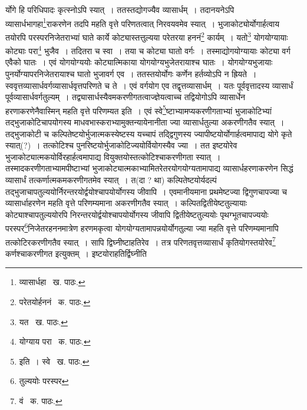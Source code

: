 \documentclass[11pt, openany]{book}
\begin{document}
\noindent र्योगे हि परिधिपादः कृत्स्नोऽपि स्यात्~। ततस्तद्योगज्यैव व्यासार्धम्~। तदानयनेऽपि व्यासार्धभागहा\renewcommand{\thefootnote}{१}\footnote{व्यासार्धहा \textendash\ ख. पाठः.}राकरणेन तदपि महति वृत्ते परिणतत्वात् निरवयवमेव स्यात्~। भुजाकोट्योर्योगार्हत्वाय तयोरपि परस्परनिजेतराभ्यां घाते कार्ये कोट्यास्तत्तुल्यया परेतरया हननं\renewcommand{\thefootnote}{२}\footnote{परेतयोर्हननं \textendash\ क. पाठः.} कार्यम्~। यतो\renewcommand{\thefootnote}{३}\footnote{यत \textendash\ ख. पाठः.} योगयोग्यायाः कोट्याः परा\renewcommand{\thefootnote}{४}\footnote{योग्याय परा \textendash\ क. पाठः.} भुजैव~। तदितरा च स्वा~। तया च कोट्या घातो वर्गः~। तस्माद्योगयोग्यायाः कोट्या वर्ग एवैको घातः~। एवं योगयोग्ययोः कोट्यात्मिकाया योगयोग्यभुजेतरायाश्च घातः~। योगयोग्यभुजायाः पुनर्योग्यापरनिजेतरायाश्च घातो भुजावर्ग एव~। ततस्तयोर्योगः कर्णेन हर्तव्योऽपि न ह्रियते~। स्ववृत्तव्यासार्धवर्गव्यासार्धवृत्तपरिणते च ते~। एवं वर्गयोग एव तद्वृत्तव्यासार्धम्~। यतः पूर्ववृत्तादस्य व्यासार्धं पूर्वव्यासार्धवर्गतुल्यम्~। तद्व्यासार्धस्यैवमकरणीगतत्वाज्ज्ञेयत्वाच्च तद्वियोगोऽपि व्यासार्धेन हरणाकरणेनैवास्मिन् महति वृत्ते परिणम्यत इति~। एवं स्वे\renewcommand{\thefootnote}{५}\footnote{इति~। स्वे \textendash\ ख. पाठः.}ष्टाभ्यामप्यकरणीगताभ्यां भुजाकोटिभ्यां तद्भुजाकोटिचापयोगस्य माधवभास्कराभ्यामुक्तन्यायेनानीता ज्या व्यासार्धतुल्या अकरणीगतैव स्यात्~। तद्भुजाकोटी च कल्पितेष्टयोर्भुजात्मकस्येष्टस्य यच्चापं तद्द्विगुणस्य ज्यापीष्टयोर्योगार्हत्वमापाद्य योगे कृते स्यात्(?)~। तत्कोटिश्च पुनरिष्टयोर्भुजाकोटिज्ययोर्वियोगस्यैव ज्या~। तत इष्टयोरेव भुजाकोट्यात्मकयोर्विरहार्हत्वमापाद्य वियुक्तयोस्तत्कोटिश्चाकरणीगता स्यात्~। तस्मादकरणीगताभ्यामपीष्टाभ्यां भुजाकोट्यात्मकाभ्यामितरेतरयोगयोग्यतामापाद्य व्यासार्धहरणाकरणेन सिद्धं व्यासार्धं तत्कर्णात्मकमकरणीगतमेव स्यात्~। त(दा ? था) कल्पितेष्टयोर्यदल्पं तद्भुजाचापतुल्ययोर्निरन्तरयोर्द्वयोश्चापयोर्योगस्य जीवापि~। एवमानीयमाना प्रथमेष्टज्या द्विगुणचापज्या
च व्यासार्धाहरणेन महति वृत्ते परिणम्यमाना अकरणीगतैव स्यात्~। कल्पितद्वितीयेष्टतुल्यायाः कोट्याश्चापतुल्ययोरपि
निरन्तरयोर्द्वयोश्चापयोर्योगस्य जीवापि द्वितीयेष्टतुल्ययोः पृथग्भूतचापज्ययोः परस्पर\renewcommand{\thefootnote}{६}\footnote{तुल्ययोः परस्पर}निजेतरहननमात्रेण हरणमकृत्वा योगयोग्यतामापन्नयोर्योगतुल्या ज्या महति वृत्ते परिणम्यमानापि तत्कोटिरकरणीगतैव स्यात्~। सापि द्विघ्नीष्टाहतिरेव~। तत्र परिणतवृत्तव्यासार्धं {\qt कृतियोगस्तयोरेव}\renewcommand{\thefootnote}{७}\footnote{वं \textendash\ क. पाठः.} {\qt कर्णश्चाकरणीगत} इत्युक्तम्~। इष्टयोराहतिर्द्विघ्नीति

\newpage 
\end{document}
